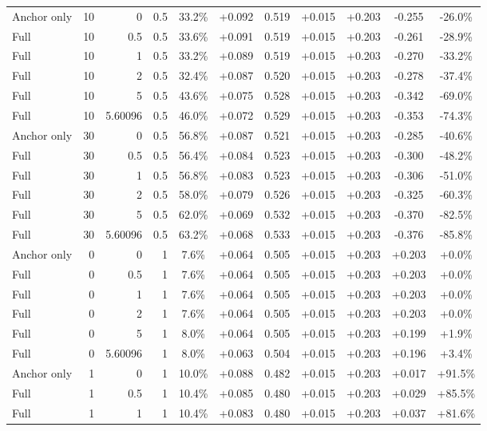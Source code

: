 \begin{table}[htbp]
\begin{tabular}{lrrrccccccc}
Anchor only & 10 & 0 & 0.5 & 33.2\% & +0.092 & 0.519 & +0.015 & +0.203 & -0.255 & -26.0\% \\
Full & 10 & 0.5 & 0.5 & 33.6\% & +0.091 & 0.519 & +0.015 & +0.203 & -0.261 & -28.9\% \\
Full & 10 & 1 & 0.5 & 33.2\% & +0.089 & 0.519 & +0.015 & +0.203 & -0.270 & -33.2\% \\
Full & 10 & 2 & 0.5 & 32.4\% & +0.087 & 0.520 & +0.015 & +0.203 & -0.278 & -37.4\% \\
Full & 10 & 5 & 0.5 & 43.6\% & +0.075 & 0.528 & +0.015 & +0.203 & -0.342 & -69.0\% \\
Full & 10 & 5.60096 & 0.5 & 46.0\% & +0.072 & 0.529 & +0.015 & +0.203 & -0.353 & -74.3\% \\
Anchor only & 30 & 0 & 0.5 & 56.8\% & +0.087 & 0.521 & +0.015 & +0.203 & -0.285 & -40.6\% \\
Full & 30 & 0.5 & 0.5 & 56.4\% & +0.084 & 0.523 & +0.015 & +0.203 & -0.300 & -48.2\% \\
Full & 30 & 1 & 0.5 & 56.8\% & +0.083 & 0.523 & +0.015 & +0.203 & -0.306 & -51.0\% \\
Full & 30 & 2 & 0.5 & 58.0\% & +0.079 & 0.526 & +0.015 & +0.203 & -0.325 & -60.3\% \\
Full & 30 & 5 & 0.5 & 62.0\% & +0.069 & 0.532 & +0.015 & +0.203 & -0.370 & -82.5\% \\
Full & 30 & 5.60096 & 0.5 & 63.2\% & +0.068 & 0.533 & +0.015 & +0.203 & -0.376 & -85.8\% \\
Anchor only & 0 & 0 & 1 & 7.6\% & +0.064 & 0.505 & +0.015 & +0.203 & +0.203 & +0.0\% \\
Full & 0 & 0.5 & 1 & 7.6\% & +0.064 & 0.505 & +0.015 & +0.203 & +0.203 & +0.0\% \\
Full & 0 & 1 & 1 & 7.6\% & +0.064 & 0.505 & +0.015 & +0.203 & +0.203 & +0.0\% \\
Full & 0 & 2 & 1 & 7.6\% & +0.064 & 0.505 & +0.015 & +0.203 & +0.203 & +0.0\% \\
Full & 0 & 5 & 1 & 8.0\% & +0.064 & 0.505 & +0.015 & +0.203 & +0.199 & +1.9\% \\
Full & 0 & 5.60096 & 1 & 8.0\% & +0.063 & 0.504 & +0.015 & +0.203 & +0.196 & +3.4\% \\
Anchor only & 1 & 0 & 1 & 10.0\% & +0.088 & 0.482 & +0.015 & +0.203 & +0.017 & +91.5\% \\
Full & 1 & 0.5 & 1 & 10.4\% & +0.085 & 0.480 & +0.015 & +0.203 & +0.029 & +85.5\% \\
Full & 1 & 1 & 1 & 10.4\% & +0.083 & 0.480 & +0.015 & +0.203 & +0.037 & +81.6\% \\

\end{tabular}
\end{table}
